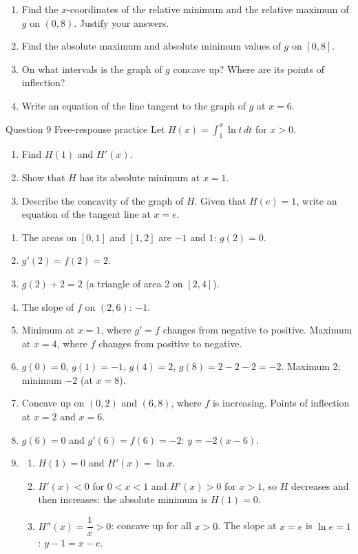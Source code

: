 \documentclass[11pt]{article}
\begin{document}
\begin{enumerate}[leftmargin=*,itemsep=2pt,start=5]
  \item Find the $x$-coordinates of the relative minimum and the relative maximum of $g$ on $(0,8)$. Justify your answers.\work{2.1cm}
  \item Find the absolute maximum and absolute minimum values of $g$ on $[0,8]$.\work{2.1cm}
  \item On what intervals is the graph of $g$ concave up? Where are its points of inflection?\work{2.1cm}
  \item Write an equation of the line tangent to the graph of $g$ at $x=6$.\work{2.1cm}
\end{enumerate}

\begin{frbox}{Question 9 \textperiodcentered{} Free-response practice}
Let $H(x)=\displaystyle\int_{1}^{x}\ln t\,dt$ for $x>0$.
\begin{enumerate}[label=(\alph*),leftmargin=*,itemsep=2pt]
  \item Find $H(1)$ and $H'(x)$.\work{1.9cm}
  \item Show that $H$ has its absolute minimum at $x=1$.\work{1.9cm}
  \item Describe the concavity of the graph of $H$. Given that $H(e)=1$, write an equation of the tangent line at $x=e$.\work{1.9cm}
\end{enumerate}
\end{frbox}

\newpage
\begin{solbox}
\begin{enumerate}[leftmargin=*,itemsep=4pt]
  \item The areas on $[0,1]$ and $[1,2]$ are $-1$ and $1$: $g(2)=0$.
  \item $g'(2)=f(2)=2$.
  \item $g(2)+2=2$ (a triangle of area 2 on $[2,4]$).
  \item The slope of $f$ on $(2,6)$: $-1$.
  \item Minimum at $x=1$, where $g'=f$ changes from negative to positive. Maximum at $x=4$, where $f$ changes from positive to negative.
  \item $g(0)=0$, $g(1)=-1$, $g(4)=2$, $g(8)=2-2-2=-2$. Maximum 2; minimum $-2$ (at $x=8$).
  \item Concave up on $(0,2)$ and $(6,8)$, where $f$ is increasing. Points of inflection at $x=2$ and $x=6$.
  \item $g(6)=0$ and $g'(6)=f(6)=-2$: $y=-2(x-6)$.
  \item \begin{enumerate}[label=(\alph*),leftmargin=*,itemsep=3pt]
    \item $H(1)=0$ and $H'(x)=\ln x$.
    \item $H'(x)<0$ for $0<x<1$ and $H'(x)>0$ for $x>1$, so $H$ decreases and then increases: the absolute minimum is $H(1)=0$.
    \item $H''(x)=\dfrac1x>0$: concave up for all $x>0$. The slope at $x=e$ is $\ln e=1$: $y-1=x-e$.
  \end{enumerate}
\end{enumerate}
\end{solbox}
\end{document}
